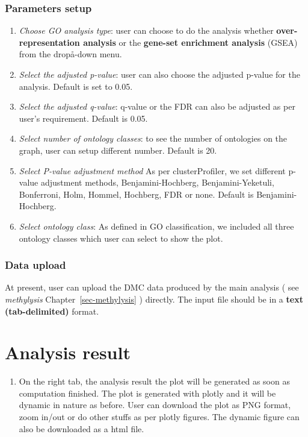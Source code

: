 \documentclass[
  a4paper,
  oneside,
  open=any]{scrreport}
\providecommand{\tightlist}{%
  \setlength{\itemsep}{0pt}\setlength{\parskip}{0pt}}\usepackage{longtable,booktabs,array}
\begin{document}
\hypertarget{parameters-setup-1}{%
\subsubsection{Parameters setup}\label{parameters-setup-1}}

\begin{enumerate}
\def\labelenumi{\arabic{enumi}.}
\tightlist
\item
  \emph{Choose GO analysis type}: user can choose to do the analysis
  whether \textbf{over-representation analysis} or the \textbf{gene-set
  enrichment analysis} (GSEA) from the dropå-down menu.
\item
  \emph{Select the adjusted p-value}: user can also choose the adjusted
  p-value for the analysis. Default is set to 0.05.
\item
  \emph{Select the adjusted q-value}: q-value or the FDR can also be
  adjusted as per user's requirement. Default is 0.05.
\item
  \emph{Select number of ontology classes}: to see the number of
  ontologies on the graph, user can setup different number. Default is
  20.
\item
  \emph{Select P-value adjustment method} As per clusterProfiler, we set
  different p-value adjustment methods, Benjamini-Hochberg,
  Benjamini-Yeketuli, Bonferroni, Holm, Hommel, Hochberg, FDR or none.
  Default is Benjamini-Hochberg.
\item
  \emph{Select ontology class}: As defined in GO classification, we
  included all three ontology classes which user can select to show the
  plot.
\end{enumerate}

\hypertarget{data-upload-4}{%
\subsubsection{Data upload}\label{data-upload-4}}

At present, user can upload the DMC data produced by the main analysis (
see \emph{methylysis} Chapter~\ref{sec-methylysis} ) directly. The input
file should be in a \textbf{text (tab-delimited)} format.

\hypertarget{analysis-result-4}{%
\section{Analysis result}\label{analysis-result-4}}

\begin{enumerate}
\def\labelenumi{\arabic{enumi}.}
\tightlist
\item
  On the right tab, the analysis result the plot will be generated as
  soon as computation finished. The plot is generated with plotly and it
  will be dynamic in nature as before. User can download the plot as PNG
  format, zoom in/out or do other stuffs as per plotly figures. The
  dynamic figure can also be downloaded as a html file.
\end{enumerate}
\end{document}
